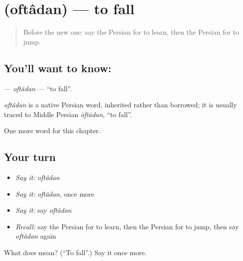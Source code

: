 \section[\texorpdfstring{\fa{افتادن} (oftâdan)}{افتادن (oftâdan)}]{ (oftâdan) — to fall}

\label{lesson:FA-C131-oftadan}



\begin{quote}
Before the new one: say the Persian for to learn, then the Persian for to jump.
\end{quote}

\subsection*{You'll want to know: }
\textbf{} — \emph{oftâdan} — \textquotedblleft{}to fall\textquotedblright{}.

\begin{cousinweb}
\emph{oftâdan} is a native Persian word, inherited rather than borrowed; it is usually traced to Middle Persian \emph{ōftādan}, \textquotedblleft{}to fall\textquotedblright{}.
\end{cousinweb}

\begin{grammarlens}[title={What you've built}]
One more word for this chapter.
\end{grammarlens}

\subsection*{Your turn}
\begin{itemize}
\raggedright
  \item \emph{Say it:} \emph{oftâdan}
  \item \emph{Say it:} \emph{oftâdan}, once more
  \item \emph{Say it:} say \emph{oftâdan}
  \item \emph{Recall:} say the Persian for to learn, then the Persian for to jump, then say \emph{oftâdan} again
\end{itemize}

\begin{tcolorbox}[breakable,colback=teal!4,colframe=teal!35!black,title={Before you move on}]
What does  mean? (\textquotedblleft{}To fall\textquotedblright{}.) Say it once more.
\end{tcolorbox}
